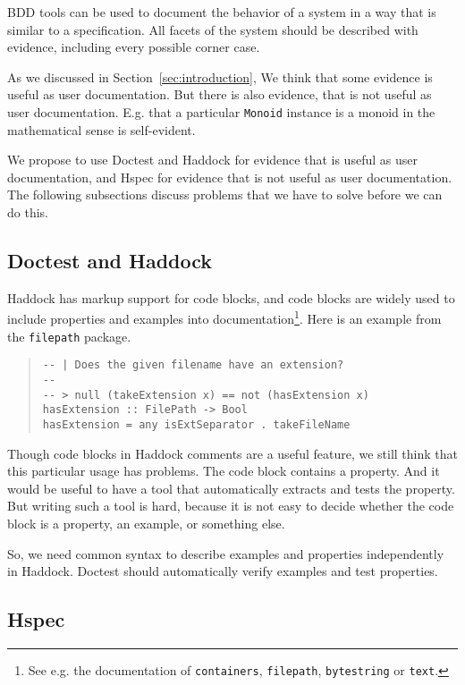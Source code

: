 \documentclass[preprint]{sigplanconf}
\begin{document}
BDD tools can be used to document the behavior of a system in a way that
is similar to a specification.  All facets of the system should be
described with evidence, including every possible corner case.

As we discussed in Section~\ref{sec:introduction},
We think that some evidence is useful as user documentation.
But there is also evidence, that is not
useful as user documentation.  E.g. that a particular \texttt{Monoid}
instance is a monoid in the mathematical sense is self-evident.

We propose to use Doctest and Haddock for evidence that is useful as
user documentation, and Hspec for evidence that is not useful as user
documentation.  The following subsections discuss problems that we
have to solve before we can do this.

\subsection{Doctest and Haddock}
\label{sec:doctest-haddock}

Haddock has markup support for code blocks, and code blocks are widely used
to include properties and examples into documentation\footnote{
See e.g. the documentation of
{\tt containers},
{\tt filepath},
{\tt bytestring} or
{\tt text}.}.
Here is an example from the {\tt filepath} package.

\begin{quote}
\small
\begin{verbatim}
-- | Does the given filename have an extension?
--
-- > null (takeExtension x) == not (hasExtension x)
hasExtension :: FilePath -> Bool
hasExtension = any isExtSeparator . takeFileName
\end{verbatim}
\end{quote}

\noindent Though code blocks in Haddock comments are a useful feature,
we still think that this particular usage has problems.  The code
block contains a property.  And it would be useful to have a tool that
automatically extracts and tests the property.
But writing such a tool is hard, because it is not easy to decide
whether the code block is a property, an example, or something else.

So, we need common syntax to describe examples and properties
independently in Haddock. Doctest should automatically verify
examples and test properties.

\subsection{Hspec}
\end{document}
